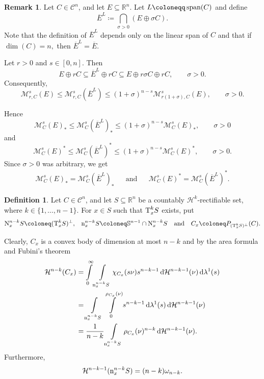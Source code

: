 \documentclass[pdflatex,sn-mathphys-num]{sn-jnl}
\theoremstyle{plain}
\theoremstyle{definition}
\newtheorem{definition}[theorem]{Definition}
\newtheorem{rem}[theorem]{Remark}
\DeclareMathOperator{\LO}{\textup{span}}
\newcommand{\dH}[1]{\,\mathrm d\mathcal{H}^{#1}}
\newcommand{\dlambda}[1]{\,\mathrm d\lambda^{#1}}
\begin{document}
\begin{rem}\label{pp11}
    Let $C\in\mathcal{C}^n$, and let $E\subseteq\mathbb{R}^n$. Let $L\coloneqq\LO(C)$ and define $$\overline{E}^L\coloneqq \bigcap_{\sigma>0}(E\oplus \sigma C).$$ Note that the definition of $\overline{E}^L$ depends only on the linear span of $C$ and that if $\dim(C)=n,$ then $\overline{E}^{L}=\overline{E}$.
    
    Let $r>0$ and $s\in[0, n]$. Then $$E\oplus rC \subseteq \overline{E}^L\oplus rC\subseteq E\oplus r\sigma C\oplus rC, \qquad \sigma>0.$$ Consequently, $$\mathcal{M}^s_{r,C}(E)\leq \mathcal{M}^s_{r,C}(\overline{E}^L)\leq (1+\sigma)^{n-s}\mathcal{M}^s_{r(1+\sigma), C}(E),\qquad \sigma>0.$$

    Hence $$\mathcal{M}^s_{C}(E)_*\leq \mathcal{M}^s_{C}(\overline{E}^L)_*\leq (1+\sigma)^{n-s}\mathcal{M}^s_{C}(E)_*,\qquad \sigma>0$$ and $$\mathcal{M}^s_{C}(E)^*\leq \mathcal{M}^s_{C}(\overline{E}^L)^*\leq (1+\sigma)^{n-s}\mathcal{M}^s_{C}(E)^*,\qquad \sigma>0.$$
    Since $\sigma>0$ was arbitrary, we get \begin{align*}
        \mathcal{M}^s_{C}(E)_*=\mathcal{M}^s_{C}(\overline{E}^L)_*&&\text{and}&&\mathcal{M}^s_{C}(E)^*=\mathcal{M}^s_{C}(\overline{E}^L)^*.
    \end{align*} 
\end{rem}

\begin{definition}
    Let $C\in\mathcal{C}^n$, and let $S\subseteq\mathbb{R}^n$ be a countably $\mathcal{H}^k$-rectifiable set, where $k\in\{1, \dots, n-1\}.$ For $x\in S$ such that $\textup{T}^k_xS$ exists, put \begin{align*}
        \textup{N}^{n-k}_xS\coloneq(\textup{T}^k_xS)^{\perp},&&\textup{n}^{n-k}_{x}S\coloneq \mathbb{S}^{n-1}\cap\textup{N}^{n-k}_xS&&\text{and}&&C_x\coloneq P_{(\textup{T}^k_xS)^{\perp}}(C).
    \end{align*}
\end{definition}
 Clearly, $C_x$ is a convex body of dimension at most $n-k$ and by the area formula and Fubini's theorem \begin{equation}\label{Eq0}\begin{split}
     \mathcal{H}^{n-k}(C_x)&=\int\limits_{0}^{\infty}\int\limits_{\textup{n}^{n-k}_{x}S}\chi_{C_x}(s\nu)s^{n-k-1}\dH{n-k-1}(\nu)\dlambda{1}(s)\\&=\int\limits_{\textup{n}^{n-k}_{x}S}\int\limits_{0}^{\rho_{C_x}(\nu)}s^{n-k-1}\dlambda{1}(s)\dH{n-k-1}(\nu)\\&=\frac{1}{n-k}\int\limits_{\textup{n}^{n-k}_{x}S}\rho_{C_x}(\nu)^{n-k}\dH{n-k-1}(\nu).
 \end{split}
\end{equation}Furthermore, \begin{equation}\label{Eq17}
     \mathcal{H}^{n-k-1}(\textup{n}^{n-k}_{x}S)=(n-k)\omega_{n-k}.
 \end{equation}
 
\end{document}
